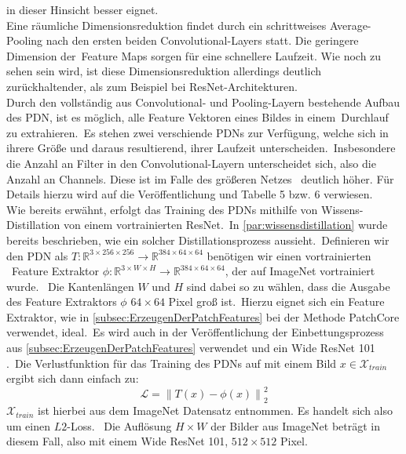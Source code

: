 in dieser Hinsicht besser eignet. \\
Eine räumliche Dimensionsreduktion findet durch ein schrittweises Average-Pooling nach den ersten beiden Convolutional-Layers statt. Die geringere Dimension der\
Feature Maps sorgen für eine schnellere Laufzeit. Wie noch zu sehen sein wird, ist diese Dimensionsreduktion allerdings deutlich zurückhaltender, als zum Beispiel bei ResNet-Architekturen.\\
Durch den vollständig aus Convolutional- und Pooling-Layern bestehende Aufbau des PDN, ist es möglich, alle Feature Vektoren eines Bildes in einem\
Durchlauf zu extrahieren.\
Es stehen zwei verschiende PDNs zur Verfügung, welche sich in ihrere Größe und daraus resultierend, ihrer Laufzeit unterscheiden.\
Insbesondere die Anzahl an Filter in den Convolutional-Layern unterscheidet sich, also die Anzahl an Channels. Diese ist im Falle des größeren Netzes \
deutlich höher. Für Details hierzu wird auf die Veröffentlichung \cite{efficientad} und Tabelle 5 bzw. 6 verwiesen.\\
Wie bereits erwähnt, erfolgt das Training des PDNs mithilfe von Wissens-Distillation von einem vortrainierten ResNet.\
In \ref{par:wissensdistillation} wurde bereits beschrieben, wie ein solcher Distillationsprozess aussieht.\
Definieren wir den PDN als $T:\mathbb{R}^{3\times 256\times 256}\rightarrow \mathbb{R}^{384\times 64\times 64}$ benötigen wir einen vortrainierten \
Feature Extraktor $\phi:\mathbb{R}^{3\times W\times H}\rightarrow \mathbb{R}^{384 \times 64\times 64}$, der auf ImageNet vortrainiert wurde. \
Die Kantenlängen $W$ und $H$ sind dabei so zu wählen, dass die Ausgabe des Feature Extraktors $\phi$ $64\times 64$ Pixel groß ist.\
Hierzu eignet sich ein Feature Extraktor, wie in \ref{subsec:ErzeugenDerPatchFeatures} bei der Methode PatchCore verwendet, ideal.\
Es wird auch in der Veröffentlichung der Einbettungsprozess aus \ref{subsec:ErzeugenDerPatchFeatures} verwendet und ein Wide ResNet 101 \cite{wideresnet}.\
Die Verlustfunktion für das Training des PDNs auf mit einem Bild $x\in\mathcal{X}_{train}$ ergibt sich dann einfach zu:\
$$
\mathcal{L}= \left\lVert T(x)-\phi(x) \right\rVert_{2}^{2}
$$
$\mathcal{X}_{train}$ ist hierbei aus dem ImageNet Datensatz entnommen. Es handelt sich also um einen $L2$-Loss. \ 
Die Auflösung $H \times W$ der Bilder aus ImageNet beträgt in diesem Fall, also mit einem Wide ResNet 101, $512\times 512$ Pixel. \\
